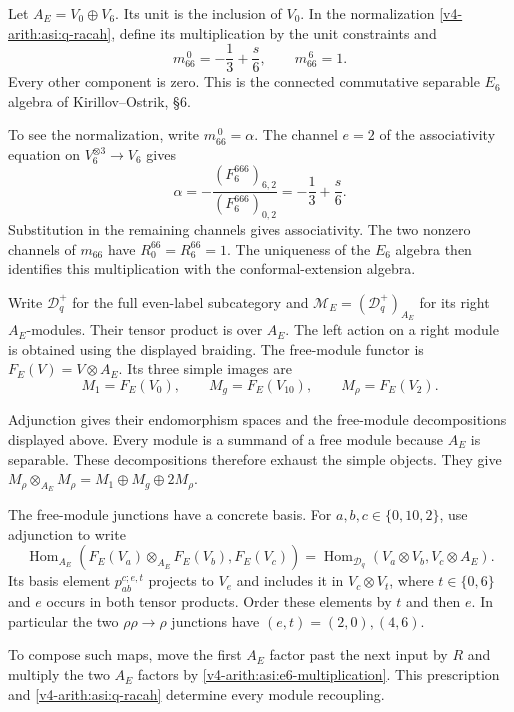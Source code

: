 Let $A_E=V_0\oplus V_6$. Its unit is the inclusion of $V_0$.
In the normalization \eqref{v4-arith:asi:q-racah}, define its multiplication
by the unit constraints and
\begin{equation}\label{v4-arith:asi:e6-multiplication}
 m_{66}^{\,0}=-\frac13+\frac{s}{6},\qquad
 m_{66}^{\,6}=1.
\end{equation}
Every other component is zero. This is the connected commutative
separable $E_6$ algebra of Kirillov--Ostrik, \S6.

To see the normalization,
write $m_{66}^{\,0}=\alpha$. The channel $e=2$ of the associativity
equation on $V_6^{\otimes3}\to V_6$ gives
\[
 \alpha=-\frac{(F^{666}_6)_{6,2}}{(F^{666}_6)_{0,2}}
        =-\frac13+\frac{s}{6}.
\]
Substitution in the remaining channels gives associativity. The two
nonzero channels of $m_{66}$ have $R^{66}_0=R^{66}_6=1$.
The uniqueness of the $E_6$ algebra then identifies this multiplication
with the conformal-extension algebra.

Write $\mathcal D_q^+$ for the full even-label subcategory and
$\mathcal M_E=(\mathcal D_q^+)_{A_E}$ for its right $A_E$-modules.
Their tensor product is over $A_E$. The left action on a right module
is obtained using the displayed braiding. The free-module functor is
$F_E(V)=V\otimes A_E$. Its three simple images are
\[
 M_1=F_E(V_0),\qquad M_g=F_E(V_{10}),\qquad
 M_\rho=F_E(V_2).
\]


Adjunction gives their endomorphism spaces and the free-module
decompositions displayed above. Every module is a summand of a free
module because $A_E$ is separable. These decompositions therefore
exhaust the simple objects. They give
$M_\rho\otimes_{A_E}M_\rho=M_1\oplus M_g\oplus2M_\rho$.

The free-module junctions have a concrete basis. For
$a,b,c\in\{0,10,2\}$, use adjunction to write
\[
 \operatorname{Hom}_{A_E}(F_E(V_a)\otimes_{A_E}F_E(V_b),F_E(V_c))
 =\operatorname{Hom}_{\mathcal D_q}(V_a\otimes V_b,V_c\otimes A_E).
\]
Its basis element $p^{c;e,t}_{ab}$ projects to $V_e$ and includes it
in $V_c\otimes V_t$, where $t\in\{0,6\}$ and
$e$ occurs in both tensor products. Order these elements by $t$ and
then $e$. In particular the two $\rho\rho\to\rho$ junctions have
$(e,t)=(2,0),(4,6)$.

To compose such maps, move the first $A_E$ factor
past the next input by $R$ and multiply the two $A_E$ factors by
\eqref{v4-arith:asi:e6-multiplication}. This prescription and
\eqref{v4-arith:asi:q-racah} determine every module recoupling.


